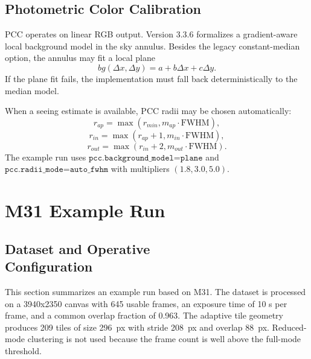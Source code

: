 \documentclass[10pt,twocolumn]{article}
\begin{document}
\subsection{Photometric Color Calibration}

PCC operates on linear RGB output. Version 3.3.6 formalizes a gradient-aware local background model in the sky annulus. Besides the legacy constant-median option, the annulus may fit a local plane
\begin{equation}
  bg(\Delta x,\Delta y) = a + b\Delta x + c\Delta y.
\end{equation}
If the plane fit fails, the implementation must fall back deterministically to the median model.

When a seeing estimate is available, PCC radii may be chosen automatically:
\begin{equation}
  r_{ap} = \max(r_{min}, m_{ap} \cdot \mathrm{FWHM}),
\end{equation}
\begin{equation}
  r_{in} = \max(r_{ap}+1, m_{in} \cdot \mathrm{FWHM}),
\end{equation}
\begin{equation}
  r_{out} = \max(r_{in}+2, m_{out} \cdot \mathrm{FWHM}).
\end{equation}
The example run uses $\texttt{pcc.background\_model=plane}$ and $\texttt{pcc.radii\_mode=auto\_fwhm}$ with multipliers $(1.8, 3.0, 5.0)$.

\section{M31 Example Run}

\subsection{Dataset and Operative \protect \\Configuration}

This section summarizes an example run based on M31.
The dataset is processed on a 3940x2350 canvas with 645 usable frames, an exposure time of 10 s per frame, and a common overlap fraction of \num{0.963}.
The adaptive tile geometry produces 209 tiles of size \SI{296}{px} with stride \SI{208}{px} and overlap \SI{88}{px}.
Reduced-mode clustering is not used because the frame count is well above the full-mode threshold.
\end{document}
